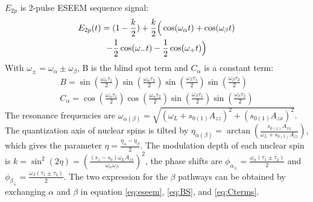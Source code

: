 \documentclass[%
 reprint,
superscriptaddress,
 amsmath,amssymb,
 aps,
]{revtex4-2}
\begin{document}
\normalsize
$ E_{2p} $ is 2-pulse ESEEM sequence signal:
\begin{gather}
	E_{2p}(t)  = (1 - \frac{k}{2}) + \frac{k}{2} \Big(\cos(\omega_\alpha t)+\cos(\omega_\beta t) \notag \\
	-\frac{1}{2} \cos(\omega_{-}t)  -\frac{1}{2} \cos(\omega_{+}t)   \Big)
\end{gather}
With $\omega_{\pm} = \omega_\alpha \pm \omega_\beta$,  B is the blind spot term and $C_\alpha$ is a constant term:
\begin{gather}
	B = \sin(\frac{\omega_\alpha \tau_1}{2}) \sin(\frac{\omega_\alpha \tau_2}{2}) \sin(\frac{\omega_\beta \tau_1}{2}) \sin(\frac{\omega_\beta \tau_2}{2})
	\label{eq:BS}\\
	C_\alpha =\cos(\frac{\omega_\alpha \tau_1}{2}) \cos(\frac{\omega_\alpha \tau_2}{2}) \sin(\frac{\omega_\beta \tau_1}{2}) \sin(\frac{\omega_\beta \tau_2}{2}) \label{eq:Cterms}
\end{gather}
The resonance frequencies are $\omega_{\alpha(\beta)} = \sqrt{(\omega_L +s_{0(1)} A_{zz} )^2 +(s_{0(1)} A_{zx})^2}$. The quantization axis of nuclear spins is tilted by $\eta_{\alpha(\beta)} = \arctan(\frac{s_{0(1)}A_{zx}}{\omega_L+ s_{0(1)}A_{zz}})$, which gives the parameter $\eta=\frac{\eta_\alpha - \eta_\beta}{2}$. The modulation depth of each nuclear spin is $k=\sin^2(2\eta)=(\frac{(s_1-s_0)\omega_L A_{zx}}{\omega_\alpha \omega_\beta})^2$, the phase shifts are $\phi_{\alpha_\pm} = \frac{\omega_\alpha (\tau_1 \pm \tau_2)}{2}$ and $\phi_{\beta_\pm} = \frac{\omega_\beta (\tau_1 \pm \tau_2)}{2}$. The two expression for the $\beta$ pathways can be obtained by exchanging $\alpha$ and $\beta$ in equation \ref{eq:eseem}, \ref{eq:BS}, and \ref{eq:Cterms}.\\
\end{document}
